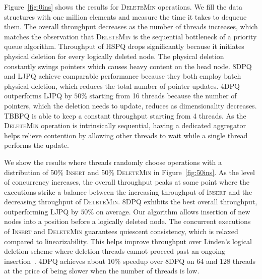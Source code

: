\documentclass[10pt,journal,letterpaper,compsoc]{IEEEtran}
\begin{document}
Figure~\ref{fig:0ins} shows the results for \textsc{DeleteMin} operations.
We fill the data structures with one million elements and measure the time it takes to dequeue them.
The overall throughput decreases as the number of threads increases, which matches the observation that \textsc{DeleteMin} is the sequential bottleneck of a priority queue algorithm.
Throughput of HSPQ drops significantly because it initiates physical deletion for every logically deleted node.
The physical deletion constantly swings pointers which causes heavy content on the head node.
8DPQ and LJPQ achieve comparable performance because they both employ batch physical deletion, which reduces the total number of pointer updates.
4DPQ outperforms LJPQ by $50\%$ starting from 16 threads because the number of pointers, which the deletion needs to update, reduces as dimensionality decreases.
TBBPQ is able to keep a constant throughput starting from 4 threads.
As the \textsc{DeleteMin} operation is intrinsically sequential, having a dedicated aggregator helps relieve contention by allowing other threads to wait while a single thread performs the update.

We show the results where threads randomly choose operations with a distribution of 50\% \textsc{Insert} and 50\% \textsc{DeleteMin} in Figure~\ref{fig:50ins}.
As the level of concurrency increases, the overall throughput peaks at some point where the executions strike a balance between the increasing throughput of \textsc{Insert} and the decreasing throughput of \textsc{DeleteMin}.
8DPQ exhibits the best overall throughput, outperforming LJPQ by $50\%$ on average.
Our algorithm allows insertion of new nodes into a position before a logically deleted node.
The concurrent executions of \textsc{Insert} and \textsc{DeleteMin} guarantees quiescent consistency, which is relaxed compared to linearizability.
This helps improve throughput over Linden's logical deletion scheme where deletion threads cannot proceed past an ongoing insertion~\cite{linden2013skiplist}.
4DPQ achieves about $10\%$ speedup over 8DPQ on 64 and 128 threads at the price of being slower when the number of threads is low. 
\end{document}
